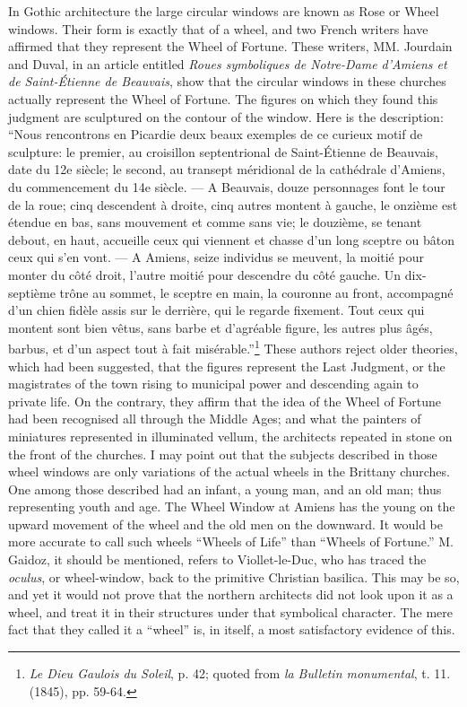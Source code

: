 \documentclass[a4paper, 11pt, oneside, polutonikogreek, english]{article}
\begin{document}
In Gothic architecture the large circular windows are known as Rose or Wheel windows. Their form is exactly that of a wheel, and two French writers have affirmed that they represent the Wheel of Fortune. These writers, MM. Jourdain and Duval, in an article entitled \emph{Roues symboliques de Notre-Dame d'Amiens et de Saint-Étienne de Beauvais}, show that the circular windows in these churches actually represent the Wheel of Fortune. The figures on which they found this judgment are sculptured on the contour of the window. Here is the description: ``Nous rencontrons en Picardie deux beaux exemples de ce curieux motif de sculpture: le premier, au croisillon septentrional de Saint-Étienne de Beauvais, date du 12e siècle; le second, au transept méridional de la cathédrale d'Amiens, du commencement du 14e siècle. --- A Beauvais, douze personnages font le tour de la roue; cinq descendent à droite, cinq autres montent à gauche, le onzième est étendue en bas, sans mouvement et comme sans vie; le douzième, se tenant debout, en haut, accueille ceux qui viennent et chasse d'un long sceptre ou bâton ceux qui s'en vont. --- A Amiens, seize individus se meuvent, la moitié pour monter du côté droit, l'autre moitié pour descendre du côté gauche. Un dix-septième trône au sommet, le sceptre en main, la couronne au front, accompagné d'un chien fidèle assis sur le derrière, qui le regarde fixement. Tout ceux qui montent sont bien vêtus, sans barbe et d'agréable figure, les autres plus âgés, barbus, et d'un aspect tout à fait misérable.''\footnote{\emph{Le Dieu Gaulois du Soleil}, p. 42; quoted from \emph{la Bulletin monumental}, t. 11. (1845), pp. 59-64.} These authors reject older theories, which had been suggested, that the figures represent the Last Judgment, or the magistrates of the town rising to municipal power and descending again to private life. On the contrary, they affirm that the idea of the Wheel of Fortune had been recognised all through the Middle Ages; and what the painters of miniatures represented in illuminated vellum, the architects repeated in stone on the front of the churches. I may point out that the subjects described in those wheel windows are only variations of the actual wheels in the Brittany churches. One among those described had an infant, a young man, and an old man; thus representing youth and age. The Wheel Window at Amiens has the young on the upward movement of the wheel and the old men on the downward. It would be more accurate to call such wheels ``Wheels of Life'' than ``Wheels of Fortune.'' M. Gaidoz, it should be mentioned, refers to Viollet-le-Duc, who has traced the \emph{oculus}, or wheel-window, back to the primitive Christian basilica. This may be so, and yet it would not prove that the northern architects did not look upon it as a wheel, and treat it in their structures under that symbolical character. The mere fact that they called it a ``wheel'' is, in itself, a most satisfactory evidence of this.
\clearpage
\end{document}

